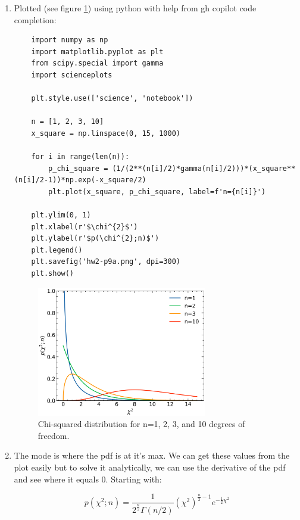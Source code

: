 \documentclass[10pt]{article}
\begin{document}
\divider

\begin{enumerate}[label=(\alph*)]
	\item Plotted (see figure \ref{fig:chi_squared_distribution}) using python with help from gh copilot code completion:

	      \begin{verbatim}
	import numpy as np
	import matplotlib.pyplot as plt
	from scipy.special import gamma
	import scienceplots

	plt.style.use(['science', 'notebook'])

	n = [1, 2, 3, 10]
	x_square = np.linspace(0, 15, 1000)

	for i in range(len(n)):
		p_chi_square = (1/(2**(n[i]/2)*gamma(n[i]/2)))*(x_square**(n[i]/2-1))*np.exp(-x_square/2)
		plt.plot(x_square, p_chi_square, label=f'n={n[i]}')
	
	plt.ylim(0, 1)
	plt.xlabel(r'$\chi^{2}$')
	plt.ylabel(r'$p(\chi^{2};n)$')
	plt.legend()
	plt.savefig('hw2-p9a.png', dpi=300)
	plt.show()
	\end{verbatim}

	      \begin{figure}[h!]
		      \centering
		      \includegraphics[width=0.7\textwidth]{hw2-p9a.png}
		      \caption{Chi-squared distribution for n=1, 2, 3, and 10 degrees of freedom.}
		      \label{fig:chi_squared_distribution}
	      \end{figure}

	\item The mode is where the pdf is at it's max. We can get these values from the plot easily but to solve it analytically, we can use the derivative of the pdf and see where it equals 0. Starting with:

	      \[ p(\chi^{2};n)=\frac{1}{2^{\frac{n}{2}}\Gamma(n/2)}(\chi^{2})^{\frac{n}{2}-1}e^{-\frac{1}{2}\chi^{2}} \]


\end{enumerate}
\end{document}
